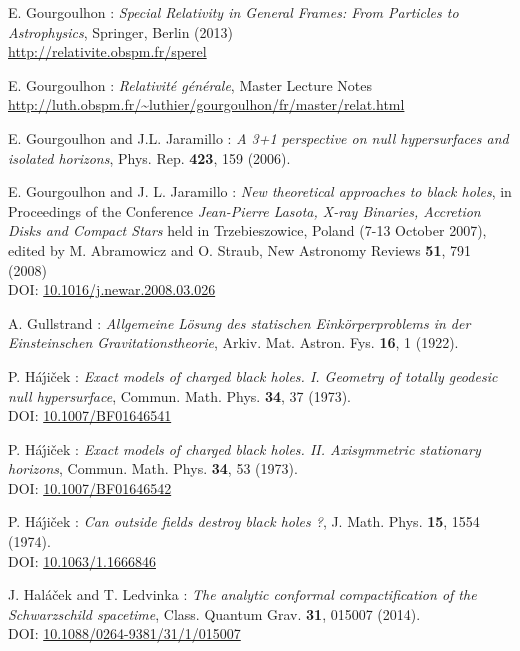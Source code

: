 \begin{thebibliography}{123}
E. Gourgoulhon : {\em Special Relativity in General Frames: From Particles to Astrophysics},
Springer, Berlin (2013) \\
\url{http://relativite.obspm.fr/sperel}

E. Gourgoulhon : {\em Relativit\'e g\'en\'erale},
Master Lecture Notes\\
\url{http://luth.obspm.fr/~luthier/gourgoulhon/fr/master/relat.html}

E. Gourgoulhon and J.L. Jaramillo : {\em A 3+1 perspective on null hypersurfaces and isolated horizons},
Phys. Rep. {\bf 423}, 159 (2006).

E. Gourgoulhon and J. L. Jaramillo : {\em New theoretical approaches to black holes},
in Proceedings of the Conference {\em Jean-Pierre Lasota, X-ray Binaries, Accretion Disks and Compact Stars} held in Trzebieszowice, Poland (7-13 October 2007), edited by M. Abramowicz and O. Straub, New Astronomy Reviews {\bf 51}, 791 (2008) \\
DOI: \href{https://doi.org/10.1016/j.newar.2008.03.026}{10.1016/j.newar.2008.03.026}

A. Gullstrand :  \emph{Allgemeine Lösung des statischen Einkörperproblems in der Einsteinschen Gravitationstheorie},
Arkiv. Mat. Astron. Fys. {\bf 16}, 1 (1922).

P. H\'a\'\j i\v{c}ek : {\em Exact models of charged black holes. I. Geometry
of totally geodesic null hypersurface},
Commun. Math. Phys. {\bf 34}, 37 (1973). \\
DOI: \href{http://dx.doi.org/10.1007/BF01646541}{10.1007/BF01646541}

P. H\'a\'\j i\v{c}ek : {\em Exact models of charged black holes.
II. Axisymmetric stationary horizons},
Commun. Math. Phys. {\bf 34}, 53 (1973). \\
DOI: \href{http://dx.doi.org/10.1007/BF01646542}{10.1007/BF01646542}

P. H\'a\'\j i\v{c}ek : {\em Can outside fields destroy black holes ?},
J. Math. Phys. {\bf 15}, 1554 (1974). \\
DOI: \href{http://dx.doi.org/10.1063/1.1666846}{10.1063/1.1666846}

J. Hal\'a\v{c}ek and T. Ledvinka :
{\em The analytic conformal compactification of the Schwarzschild spacetime},
Class. Quantum Grav. {\bf 31}, 015007 (2014).\\
DOI: \href{http://dx.doi.org/10.1088/0264-9381/31/1/015007}{10.1088/0264-9381/31/1/015007}


\end{thebibliography}
